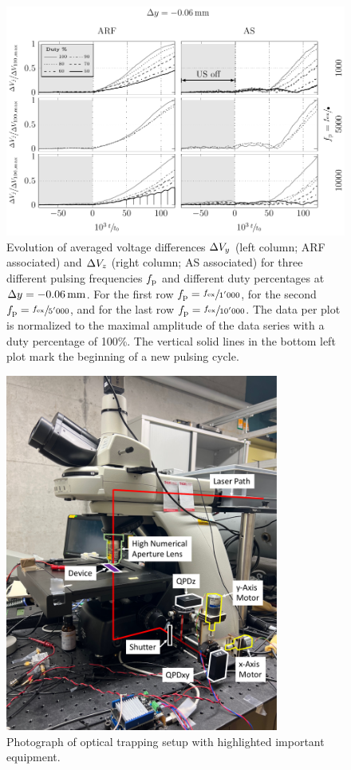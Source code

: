 \begin{figure}[tbp]
  \centering
  \includegraphics[]{External/duty-m06.pdf}
  \caption{Evolution of averaged voltage differences $\Delta V_{y}$ (left column; 
      ARF associated) and $\Delta V_{z}$ (right column; AS associated) for three 
      different pulsing frequencies $f_{\mathrm{p}}$ and different duty percentages at 
      $\Dy=\SI{-0.06}{\mm}$. For the first row $f_{\mathrm{p}}=\sfrac{f_{\mathrm{ex}}}{1'000}$, for 
      the second $f_{\mathrm{p}}=\sfrac{f_{\mathrm{ex}}}{5'000}$, and for the last row 
      $f_{\mathrm{p}}=\sfrac{f_{\mathrm{ex}}}{10'000}$. The data per plot is normalized to the 
      maximal amplitude of the data series with a duty percentage of 100\%. The 
      vertical solid lines in the bottom left plot mark the beginning of a new 
      pulsing cycle.
}
\end{figure}

\newpage
\begin{figure}[tbp]
  \centering
  \includegraphics[width=0.8\textwidth]{SECTION/15_Figures/Supplemental_OT.pdf}
  \caption{Photograph of optical trapping setup with highlighted important 
  equipment.}
\end{figure}

